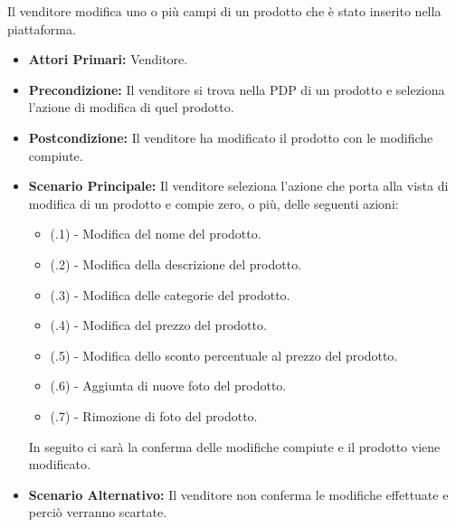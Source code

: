 
Il venditore modifica uno o più campi di un prodotto che è stato inserito nella piattaforma.
\begin{itemize}
    \item \textbf{Attori Primari:} Venditore.
    \item \textbf{Precondizione:} Il venditore si trova nella PDP di un prodotto e seleziona l'azione di modifica di quel prodotto.
    \item \textbf{Postcondizione:} Il venditore ha modificato il prodotto con le modifiche compiute.
    \item \textbf{Scenario Principale:} Il venditore seleziona l'azione che porta alla vista di modifica di un prodotto e compie zero, o più, delle seguenti azioni:
    \begin{itemize}
        \item (\actualUC.1) - Modifica del nome del prodotto.
        \item (\actualUC.2) - Modifica della descrizione del prodotto.
        \item (\actualUC.3) - Modifica delle categorie del prodotto.
        \item (\actualUC.4) - Modifica del prezzo del prodotto.
        \item (\actualUC.5) - Modifica dello sconto percentuale al prezzo del prodotto.
        \item (\actualUC.6) - Aggiunta di nuove foto del prodotto.
        \item (\actualUC.7) - Rimozione di foto del prodotto.
    \end{itemize}
    In seguito ci sarà la conferma delle modifiche compiute e il prodotto viene modificato.
    \item \textbf{Scenario Alternativo:} Il venditore non conferma le modifiche effettuate e perciò verranno scartate.
\end{itemize}

\resetSubUC

